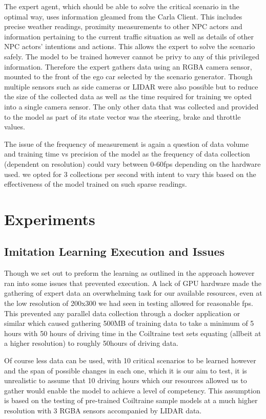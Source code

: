 \documentclass[conference, 11pt]{IEEEtran}
\begin{document}
The expert agent, which should be able to solve the critical scenario in the optimal way, uses information gleamed from the Carla Client. This includes precise weather readings, proximity measurements to other NPC actors and information pertaining to the current traffic situation as well as details of other NPC actors' intentions and actions. This allows the expert to solve the scenario safely. The model to be trained however cannot be privy to any of this privileged information. Therefore the expert gathers data using an RGBA camera sensor, mounted to the front of the ego car selected by the scenario generator. Though multiple sensors such as side cameras or LIDAR were also possible but to reduce the size of the collected data as well as the time required for training we opted into a single camera sensor. The only other data that was collected and provided to the model as part of its state vector was the steering, brake and throttle values.

The issue of the frequency of measurement is again a question of data volume and training time vs precision of the model as the frequency of data collection (dependent on resolution) could vary between 0-60fps depending on the hardware used. we opted for 3 collections per second with intent to vary this based on the effectiveness of the model trained on such sparse readings.




\section{Experiments}
\subsection{Imitation Learning Execution and Issues}
Though we set out to preform the learning as outlined in the approach however ran into some issues that prevented execution. A lack of GPU hardware made the gathering of expert data an overwhelming task for our available resources, even at the low resolution of 200x300 we had seen in testing allowed for reasonable fps. This prevented any parallel data collection through a docker application or similar which caused gathering 500MB of training data to take a minimum of 5 hours with 50 hours of driving time in the Coiltraine test sets equating (allbeit at a higher resolution) to roughly 50hours of driving data.

Of course less data can be used, with 10 critical scenarios to be learned however and the span of possible changes in each one, which it is our aim to test, it is unrealistic to assume that 10 driving hours which our resources allowed us to gather would enable the model to achieve a level of competency. This assumption is based on the testing of pre-trained Coiltraine sample models at a much higher resolution with 3 RGBA sensors accompanied by LIDAR data.
\end{document}
